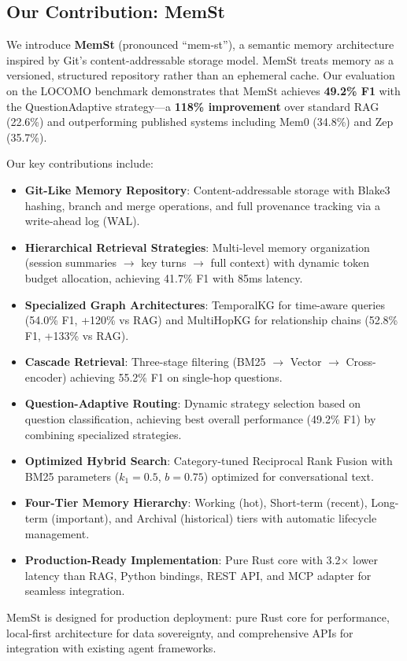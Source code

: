 \subsection{Our Contribution: MemSt}

We introduce \textbf{MemSt} (pronounced ``mem-st''), a semantic memory architecture inspired by Git's content-addressable storage model. MemSt treats memory as a versioned, structured repository rather than an ephemeral cache. Our evaluation on the LOCOMO benchmark demonstrates that MemSt achieves \textbf{49.2\% F1} with the QuestionAdaptive strategy---a \textbf{118\% improvement} over standard RAG (22.6\%) and outperforming published systems including Mem0 (34.8\%) and Zep (35.7\%).

Our key contributions include:

\begin{itemize}
    \item \textbf{Git-Like Memory Repository}: Content-addressable storage with Blake3 hashing, branch and merge operations, and full provenance tracking via a write-ahead log (WAL).
    
    \item \textbf{Hierarchical Retrieval Strategies}: Multi-level memory organization (session summaries $\rightarrow$ key turns $\rightarrow$ full context) with dynamic token budget allocation, achieving 41.7\% F1 with 85ms latency.
    
    \item \textbf{Specialized Graph Architectures}: TemporalKG for time-aware queries (54.0\% F1, +120\% vs RAG) and MultiHopKG for relationship chains (52.8\% F1, +133\% vs RAG).
    
    \item \textbf{Cascade Retrieval}: Three-stage filtering (BM25 $\rightarrow$ Vector $\rightarrow$ Cross-encoder) achieving 55.2\% F1 on single-hop questions.
    
    \item \textbf{Question-Adaptive Routing}: Dynamic strategy selection based on question classification, achieving best overall performance (49.2\% F1) by combining specialized strategies.
    
    \item \textbf{Optimized Hybrid Search}: Category-tuned Reciprocal Rank Fusion with BM25 parameters ($k_1=0.5$, $b=0.75$) optimized for conversational text.
    
    \item \textbf{Four-Tier Memory Hierarchy}: Working (hot), Short-term (recent), Long-term (important), and Archival (historical) tiers with automatic lifecycle management.
    
    \item \textbf{Production-Ready Implementation}: Pure Rust core with 3.2$\times$ lower latency than RAG, Python bindings, REST API, and MCP adapter for seamless integration.
\end{itemize}

MemSt is designed for production deployment: pure Rust core for performance, local-first architecture for data sovereignty, and comprehensive APIs for integration with existing agent frameworks.
